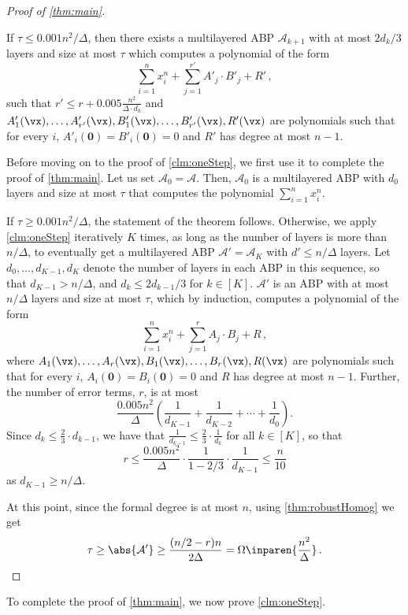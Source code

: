 \begin{proof}[Proof of \autoref{thm:main}]
\begin{claim}
		If $\tau \leq 0.001 n^2/\Delta$, then there exists a multilayered ABP $\mathcal{A}_{k+1}$ with at most $2 d_k/3$ layers and size at most $\tau$ which computes a polynomial of the form 
		\[\sum_{i = 1}^n x_i^n + \sum_{j = 1}^{r'} A'_j\cdot B'_j + R'\, ,\]
		such that $r' \leq  r + 0.005\frac{n^2}{\Delta \cdot d_k}$ and $A'_1(\vx), \ldots, A'_{r'}(\vx), B'_1(\vx), \ldots, B'_{r'}(\vx), R'(\vx)$ are polynomials such that for every $i$, $A'_i(\mathbf{0}) = B'_i(\mathbf{0}) = 0$ and $R'$ has degree at most $n-1$.
	\end{claim}
	
	Before moving on to the proof of  \autoref{clm:oneStep}, we first use it to complete the proof of  \autoref{thm:main}. Let us set $\mathcal{A}_0 = \mathcal{A}$. Then, $\mathcal{A}_0$ is a multilayered ABP with $d_0$ layers and size at most $\tau $ that computes the polynomial $\sum_{i = 1}^n x_i^n$.
		
	If $\tau \geq 0.001 n^2/\Delta$, the statement of the theorem follows. Otherwise, we apply \autoref{clm:oneStep} iteratively $K$ times, as long as the number of layers is more than $n/\Delta$, to  eventually get a multilayered ABP $\mathcal{A}' = \mathcal{A}_{K}$ with $d' \le n/\Delta$ layers. Let $d_0, \ldots, d_{K-1},d_K$ denote the number of layers in each ABP in this sequence, so that $d_{K-1} > n/\Delta$, and $d_k \le 2 d_{k-1}/3$ for $k \in [K]$.  $\mathcal{A}'$ is an ABP with at most $n/\Delta$ layers and size at most $\tau$, which by induction, computes a polynomial of the form
	\[\sum_{i = 1}^n x_i^n + \sum_{j = 1}^r A_j\cdot B_j + R \, ,\]
	where $A_1(\vx), \ldots, A_r(\vx), B_1(\vx), \ldots, B_r(\vx), R(\vx)$ are polynomials such that for every $i$, $A_i(\mathbf{0}) = B_i(\mathbf{0}) = 0$ and $R$ has degree at most $n-1$. Further, the number of error terms, $r$, is at most 
	\[
 		\frac{0.005 n^2} {\Delta} \left( \frac{1}{d_{K-1}} + \frac{1}{d_{K-2}} + \cdots + \frac{1}{d_0} \right).
	\]
	Since $d_k \le \frac{2}{3} \cdot d_{k-1}$, we have that $\frac{1}{d_{k-1}} \le \frac{2}{3} \cdot \frac{1}{d_k}$ for all $k \in [K]$, so that
\[
r \le \frac{0.005n^2}{\Delta} \cdot \frac{1}{1-2/3} \cdot \frac{1}{d_{K-1}} \le \frac{n}{10}
\]
as $d_{K-1} \ge n/\Delta$.	

	At this point, since the formal degree is at most $n$, using \autoref{thm:robustHomog} we get 
	\[
		\tau \geq \abs{\mathcal{A}'} \geq \dfrac{(n/2-r)n}{2\Delta} = \Omega \inparen{\dfrac{n^2}{\Delta}} \, . \qedhere 
	\]
\end{proof}
		
To complete the proof of  \autoref{thm:main}, we now prove \autoref{clm:oneStep}.

